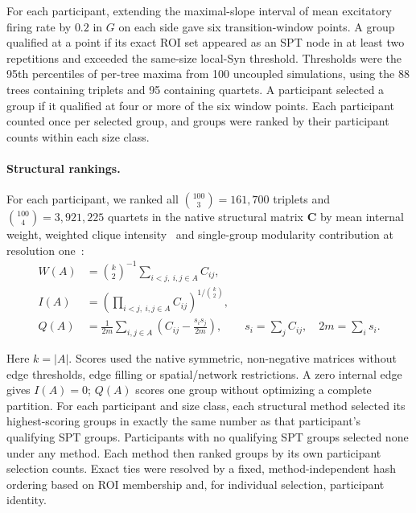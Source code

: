 \documentclass[fleqn,10pt]{wlscirep}
\begin{document}
For each participant, extending the maximal-slope interval of mean excitatory firing rate by $0.2$ in $G$ on each side gave six transition-window points. A group qualified at a point if its exact ROI set appeared as an SPT node in at least two repetitions and exceeded the same-size local-Syn threshold. Thresholds were the 95th percentiles of per-tree maxima from 100 uncoupled simulations, using the 88 trees containing triplets and 95 containing quartets. A participant selected a group if it qualified at four or more of the six window points. Each participant counted once per selected group, and groups were ranked by their participant counts within each size class.

\paragraph{Structural rankings.}
For each participant, we ranked all $\binom{100}{3}=161{,}700$ triplets and $\binom{100}{4}=3{,}921{,}225$ quartets in the native structural matrix $\boldsymbol{C}$ by mean internal weight, weighted clique intensity~\cite{Onnela2005WeightedMotifs} and single-group modularity contribution at resolution one~\cite{Newman2004WeightedNetworks}:
\begingroup
\begin{equation}
\begin{aligned}
W(A)&=\binom{k}{2}^{-1}\sum_{i<j,\ i,j\in A}C_{ij},\\
I(A)&=\left(\prod_{i<j,\ i,j\in A}C_{ij}\right)^{1/\binom{k}{2}},\\
Q(A)&=\frac{1}{2m}\sum_{i,j\in A}\left(C_{ij}-\frac{s_i s_j}{2m}\right),
\qquad s_i=\sum_j C_{ij},\quad 2m=\sum_i s_i.
\end{aligned}
\label{eq:dmf_static_coalition_scores}
\end{equation}
\endgroup

Here $k=|A|$. Scores used the native symmetric, non-negative matrices without edge thresholds, edge filling or spatial/network restrictions. A zero internal edge gives $I(A)=0$; $Q(A)$ scores one group without optimizing a complete partition. For each participant and size class, each structural method selected its highest-scoring groups in exactly the same number as that participant's qualifying SPT groups. Participants with no qualifying SPT groups selected none under any method. Each method then ranked groups by its own participant selection counts. Exact ties were resolved by a fixed, method-independent hash ordering based on ROI membership and, for individual selection, participant identity.
\end{document}

